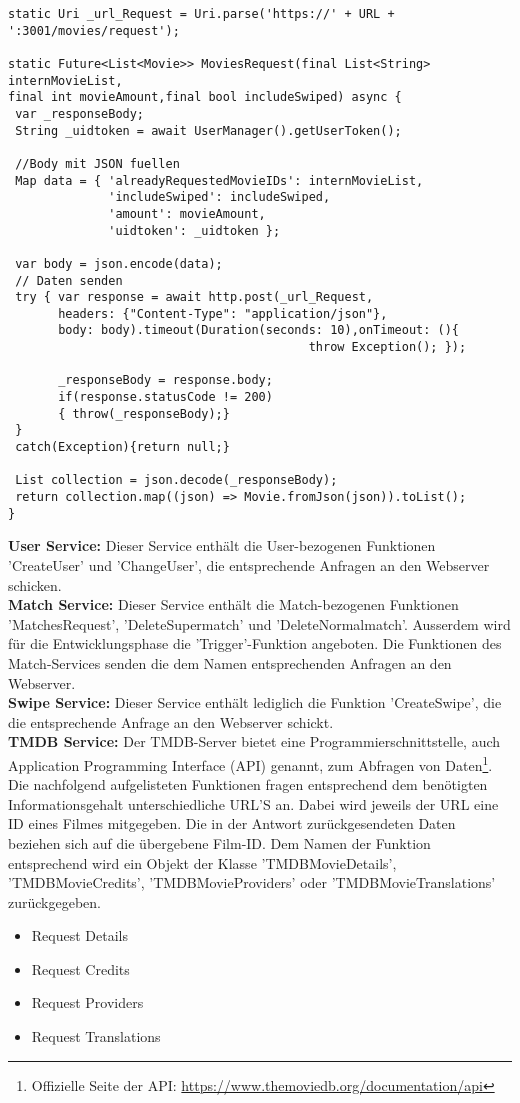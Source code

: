 \begin{lstlisting}[caption=Movie Service - MoviesRequest, label=lst:MoviesRequest]
static Uri _url_Request = Uri.parse('https://' + URL + ':3001/movies/request');

static Future<List<Movie>> MoviesRequest(final List<String> internMovieList,
final int movieAmount,final bool includeSwiped) async {
 var _responseBody;
 String _uidtoken = await UserManager().getUserToken();

 //Body mit JSON fuellen
 Map data = { 'alreadyRequestedMovieIDs': internMovieList,
              'includeSwiped': includeSwiped,
              'amount': movieAmount,
              'uidtoken': _uidtoken };
              
 var body = json.encode(data);
 // Daten senden
 try { var response = await http.post(_url_Request,
       headers: {"Content-Type": "application/json"},
       body: body).timeout(Duration(seconds: 10),onTimeout: (){
                                          throw Exception(); });
      
       _responseBody = response.body;
       if(response.statusCode != 200)
       { throw(_responseBody);}
 }
 catch(Exception){return null;}

 List collection = json.decode(_responseBody);
 return collection.map((json) => Movie.fromJson(json)).toList();
}
\end{lstlisting}



\noindent
\textbf{User Service:} Dieser Service enthält die User-bezogenen Funktionen 'CreateUser' und 'ChangeUser', die entsprechende Anfragen an den Webserver schicken.\\

\noindent
\textbf{Match Service:} Dieser Service enthält die Match-bezogenen Funktionen 'MatchesRequest', 'DeleteSupermatch' und 'DeleteNormalmatch'.
Ausserdem wird für die Entwicklungsphase die 'Trigger'-Funktion angeboten.
Die Funktionen des Match-Services senden die dem Namen entsprechenden Anfragen an den Webserver.\\

\noindent
\textbf{Swipe Service:}
Dieser Service enthält lediglich die Funktion 'CreateSwipe', die die entsprechende Anfrage an den Webserver schickt.\\

\noindent
\textbf{TMDB Service:}
Der TMDB-Server bietet eine Programmierschnittstelle, auch Application Programming Interface (API) genannt, zum Abfragen von Daten\footnote{Offizielle Seite der API: \url{https://www.themoviedb.org/documentation/api}}. 
Die nachfolgend aufgelisteten Funktionen fragen entsprechend dem benötigten Informationsgehalt unterschiedliche URL'S an. 
Dabei wird jeweils der URL eine ID eines Filmes mitgegeben. Die in der Antwort zurückgesendeten Daten beziehen sich auf die übergebene Film-ID. 
Dem Namen der Funktion entsprechend wird ein Objekt der Klasse 'TMDBMovieDetails', 'TMDBMovieCredits', 'TMDBMovieProviders' oder 'TMDBMovieTranslations' zurückgegeben.

\begin{itemize}
\item Request Details
\item Request Credits
\item Request Providers
\item Request Translations
\end{itemize}
